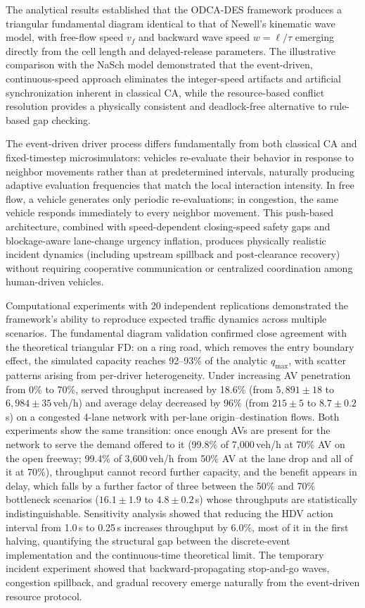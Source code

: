 \documentclass[review,authoryear]{elsarticle}
\begin{document}
The analytical results established that the ODCA-DES framework produces a triangular fundamental diagram identical to that of Newell's kinematic wave model, with free-flow speed $v_f$ and backward wave speed $w = \ell/\tau$ emerging directly from the cell length and delayed-release parameters. The illustrative comparison with the NaSch model demonstrated that the event-driven, continuous-speed approach eliminates the integer-speed artifacts and artificial synchronization inherent in classical CA, while the resource-based conflict resolution provides a physically consistent and deadlock-free alternative to rule-based gap checking.

The event-driven driver process differs fundamentally from both classical CA and fixed-timestep microsimulators: vehicles re-evaluate their behavior in response to neighbor movements rather than at predetermined intervals, naturally producing adaptive evaluation frequencies that match the local interaction intensity. In free flow, a vehicle generates only periodic re-evaluations; in congestion, the same vehicle responds immediately to every neighbor movement. This push-based architecture, combined with speed-dependent closing-speed safety gaps and blockage-aware lane-change urgency inflation, produces physically realistic incident dynamics (including upstream spillback and post-clearance recovery) without requiring cooperative communication or centralized coordination among human-driven vehicles.

Computational experiments with 20 independent replications demonstrated the framework's ability to reproduce expected traffic dynamics across multiple scenarios. The fundamental diagram validation confirmed close agreement with the theoretical triangular FD: on a ring road, which removes the entry boundary effect, the simulated capacity reaches 92--93\% of the analytic $q_{\max}$, with scatter patterns arising from per-driver heterogeneity. Under increasing AV penetration from 0\% to 70\%, served throughput increased by 18.6\% (from $5{,}891 \pm 18$ to $6{,}984 \pm 35$\,veh/h) and average delay decreased by 96\% (from $215 \pm 5$ to $8.7 \pm 0.2$\,s) on a congested 4-lane network with per-lane origin--destination flows. Both experiments show the same transition: once enough AVs are present for the network to serve the demand offered to it (99.8\% of 7{,}000\,veh/h at 70\% AV on the open freeway; 99.4\% of 3{,}600\,veh/h from 50\% AV at the lane drop and all of it at 70\%), throughput cannot record further capacity, and the benefit appears in delay, which falls by a further factor of three between the 50\% and 70\% bottleneck scenarios ($16.1 \pm 1.9$ to $4.8 \pm 0.2$\,s) whose throughputs are statistically indistinguishable. Sensitivity analysis showed that reducing the HDV action interval from 1.0\,s to 0.25\,s increases throughput by 6.0\%, most of it in the first halving, quantifying the structural gap between the discrete-event implementation and the continuous-time theoretical limit. The temporary incident experiment showed that backward-propagating stop-and-go waves, congestion spillback, and gradual recovery emerge naturally from the event-driven resource protocol.
\end{document}

